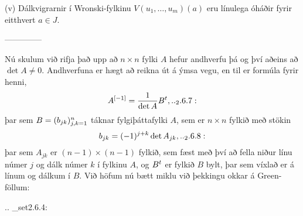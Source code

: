 \item{(v)}  Dálkvigrarnir í Wronski-fylkinu $V(u_1,\dots,u_m)(a)$  eru
línulega óháðir fyrir eitthvert $a\in J$.


--------------



Nú skulum við rifja það upp að $n\times n$ fylki $A$ hefur andhverfu
þá og því aðeins að $\det A\neq 0$.  Andhverfuna er hægt að reikna út
á ýmsa vegu, en til er formúla fyrir henni,
 \begin{equation*}A\sp{[-1]}=\dfrac 1{\det A}B\sp t,

.. _2.6.7:

 \end{equation*}
þar sem $B=(b_{jk})_{j,k=1}\sp n$ táknar fylgiþáttafylki $A$, sem 
er $n\times n$ fylkið með stökin
 \begin{equation*}b_{jk}=(-1)\sp{j+k}\det A_{jk},

.. _2.6.8:

 \end{equation*}
þar sem $A_{jk}$ er $(n-1)\times (n-1)$ fylkið, sem fæst með því að
fella niður línu númer $j$ og dálk númer $k$ í fylkinu $A$, og $B\sp
t$ er fylkið $B$ bylt, þar sem víxlað er á línum og dálkum í $B$.
Við höfum nú bætt miklu við þekkingu okkar á Green-föllum:



.. _set2.6.4:

